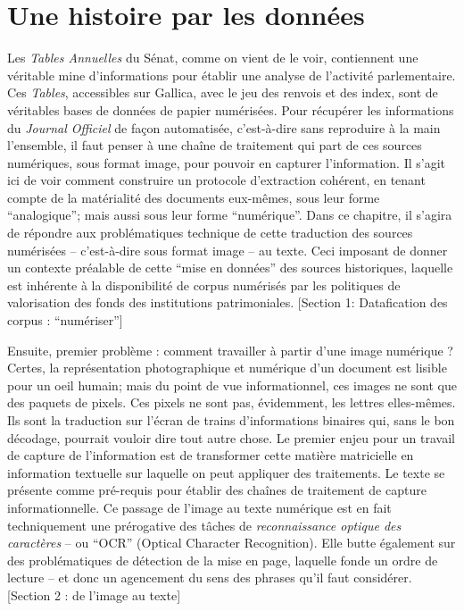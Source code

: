 \chapter{Une histoire par les données}

Les \emph{Tables Annuelles} du Sénat, comme on vient de le voir, contiennent une véritable mine d'informations pour établir une analyse de l'activité parlementaire. Ces \emph{Tables}, accessibles sur Gallica, avec le jeu des renvois et des index, sont de véritables bases de données de papier numérisées. Pour récupérer les informations du \emph{Journal Officiel} de façon automatisée, c'est-à-dire sans reproduire à la main l'ensemble, il faut penser à une chaîne de traitement qui part de ces sources numériques, sous format image, pour pouvoir en capturer l'information. Il s'agit ici de voir comment construire un protocole d’extraction cohérent, en tenant compte de la matérialité des documents eux-mêmes, sous leur forme \enquote{analogique}; mais aussi sous leur forme \enquote{numérique}. Dans ce chapitre, il s'agira de répondre aux problématiques technique de cette traduction des sources numérisées -- c'est-à-dire sous format image -- au texte. Ceci imposant de donner un contexte préalable de cette \enquote{mise en données} des sources historiques, laquelle est inhérente à la disponibilité de corpus numérisés par les politiques de valorisation des fonds des institutions patrimoniales. [Section 1: Datafication des corpus : \enquote{numériser}]

Ensuite, premier problème : comment travailler à partir d'une image numérique ? Certes, la représentation photographique et numérique d'un document est lisible pour un oeil humain; mais du point de vue informationnel, ces images ne sont que des paquets de pixels. Ces pixels ne sont pas, évidemment, les lettres elles-mêmes. Ils sont la traduction sur l'écran de trains d'informations binaires qui, sans le bon décodage, pourrait vouloir dire tout autre chose. Le premier enjeu pour un travail de capture de l'information est de transformer cette matière matricielle en information textuelle sur laquelle on peut appliquer des traitements. Le texte se présente comme pré-requis pour établir des chaînes de traitement de capture informationnelle. Ce passage de l'image au texte numérique est en fait techniquement une prérogative des tâches de \emph{reconnaissance optique des caractères} -- ou \enquote{OCR} (Optical Character Recognition). Elle butte également sur des problématiques de détection de la mise en page, laquelle fonde un ordre de lecture -- et donc un agencement du sens des phrases qu'il faut considérer. [Section 2 : de l'image au texte]

